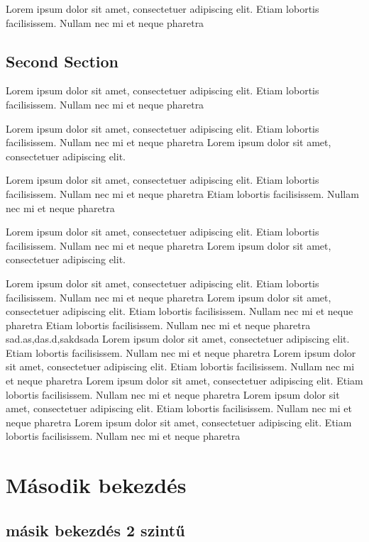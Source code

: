 \documentclass[12pt,oneside,justify]{book}
\begin{document}
Lorem ipsum dolor sit amet, consectetuer adipiscing elit.  
Etiam lobortis facilisissem.  Nullam nec mi et neque pharetra  

\section{Second Section}
 
Lorem ipsum dolor sit amet, consectetuer adipiscing elit.  
Etiam lobortis facilisissem.  Nullam nec mi et neque pharetra  
 
Lorem ipsum dolor sit amet, consectetuer adipiscing elit.  
Etiam lobortis facilisissem.  Nullam nec mi et neque pharetra Lorem ipsum dolor sit amet, consectetuer adipiscing elit.  
 
Lorem ipsum dolor sit amet, consectetuer adipiscing elit.  
Etiam lobortis facilisissem.  Nullam nec mi et neque pharetra Etiam lobortis facilisissem.  Nullam nec mi et neque pharetra  
 
Lorem ipsum dolor sit amet, consectetuer adipiscing elit.  
Etiam lobortis facilisissem.  Nullam nec mi et neque pharetra Lorem ipsum dolor sit amet, consectetuer adipiscing elit.  
 
Lorem ipsum dolor sit amet, consectetuer adipiscing elit.  
Etiam lobortis facilisissem.  Nullam nec mi et neque pharetra  
Lorem ipsum dolor sit amet, consectetuer adipiscing elit.  
Etiam lobortis facilisissem.  Nullam nec mi et neque pharetra Etiam lobortis facilisissem.  Nullam nec mi et neque pharetra 
 sad.as,das.d,sakdsada
Lorem ipsum dolor sit amet, consectetuer adipiscing elit.  
Etiam lobortis facilisissem.  Nullam nec mi et neque pharetra  
Lorem ipsum dolor sit amet, consectetuer adipiscing elit.  
Etiam lobortis facilisissem.  Nullam nec mi et neque pharetra  
Lorem ipsum dolor sit amet, consectetuer adipiscing elit.  
Etiam lobortis facilisissem.  Nullam nec mi et neque pharetra  
Lorem ipsum dolor sit amet, consectetuer adipiscing elit.  
Etiam lobortis facilisissem.  Nullam nec mi et neque pharetra  
Lorem ipsum dolor sit amet, consectetuer adipiscing elit.  
Etiam lobortis facilisissem.  Nullam nec mi et neque pharetra  

\chapter{Második bekezdés}

\section{másik bekezdés 2 szintű}
 
\end{document}
